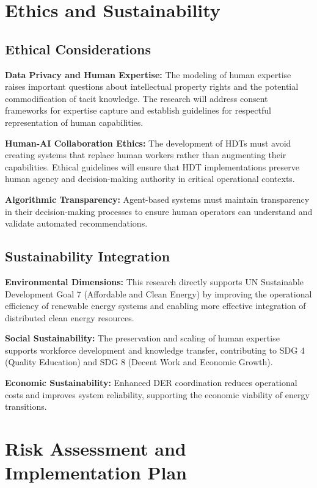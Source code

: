 \documentclass[12pt,a4paper]{article}
\begin{document}
\section{Ethics and Sustainability}
\label{sec:ethics}

\subsection{Ethical Considerations}

\noindent \textbf{Data Privacy and Human Expertise:} The modeling of human expertise raises important questions about intellectual property rights and the potential commodification of tacit knowledge. The research will address consent frameworks for expertise capture and establish guidelines for respectful representation of human capabilities.

\noindent \textbf{Human-AI Collaboration Ethics:} The development of HDTs must avoid creating systems that replace human workers rather than augmenting their capabilities. Ethical guidelines will ensure that HDT implementations preserve human agency and decision-making authority in critical operational contexts.

\noindent \textbf{Algorithmic Transparency:} Agent-based systems must maintain transparency in their decision-making processes to ensure human operators can understand and validate automated recommendations.

\subsection{Sustainability Integration}

\noindent \textbf{Environmental Dimensions:} This research directly supports UN Sustainable Development Goal 7 (Affordable and Clean Energy) by improving the operational efficiency of renewable energy systems and enabling more effective integration of distributed clean energy resources.

\noindent \textbf{Social Sustainability:} The preservation and scaling of human expertise supports workforce development and knowledge transfer, contributing to SDG 4 (Quality Education) and SDG 8 (Decent Work and Economic Growth).

\noindent \textbf{Economic Sustainability:} Enhanced DER coordination reduces operational costs and improves system reliability, supporting the economic viability of energy transitions.

\section{Risk Assessment and Implementation Plan}
\label{sec:risks}
\end{document}

